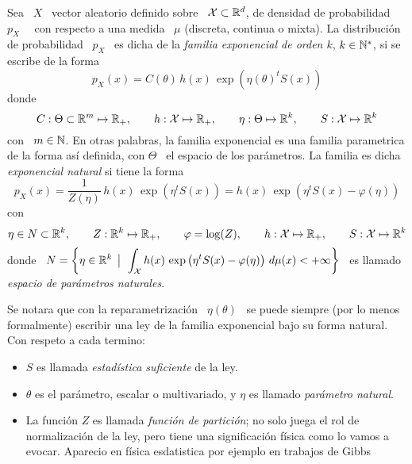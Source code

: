 \begin{definicion}\label{Def:MP:FamiliaExponencial}
%
  Sea  \ $X$  \  vector aleatorio  definido  sobre \  $\mathcal{X}  \subset \mathbb{R}^d$,  de
  densidad  de probabilidad  \  $p_X$ \  \ con  respecto  a una  medida \  $\mu$
  (discreta, continua o  mixta). La distribuci\'on de probabilidad  \ $p_X$ \ es
  dicha de  la {\em familia  exponencial de orden  $k$}, $k \in \mathbb{N}^*$,  si se
  escribe de la forma
  \[
  p_X(x) = C(\theta) \, h(x) \, \exp\left( \eta(\theta)^t S(x) \right)
  \]
  donde
  \[
  C:  \Theta \subset  \mathbb{R}^m \mapsto  \mathbb{R}_+,  \qquad h:  \mathcal{X} \mapsto  \mathbb{R}_+,
  \qquad \eta: \Theta \mapsto \mathbb{R}^k, \qquad S: \mathcal{X} \mapsto \mathbb{R}^k
  \]
  con \ $m \in \mathbb{N}$.  En otras palabras, la familia exponencial es una familia
  parametrica  de la  forma as\'i  definida, con  $\Theta$ \  el espacio  de los
  par\'ametros. La familia es dicha {\em exponencial natural} si tiene la forma
  \[
  p_X(x) = \frac{1}{Z(\eta)}  \, h(x) \, \exp\left( \eta^t  S(x) \right) = h(x)
  \, \exp\left( \eta^t S(x) - \varphi(\eta) \right)
  \]
  con
  \[
  \eta \in N \subset \mathbb{R}^k, \qquad Z: \mathbb{R}^k \mapsto \mathbb{R}_+, \qquad \varphi = \log(Z),
  \qquad h: \mathcal{X} \mapsto \mathbb{R}_+, \qquad S: \mathcal{X} \mapsto \mathbb{R}^k
  \]
  donde \  $\displaystyle N = \left\{ \eta \in  \mathbb{R}^k \:\: \big| \:\: \int_{\mathcal{X}} h(x)  \, \exp\left( \eta^t
      S(x) - \varphi(\eta) \right) \, d\mu(x)  < + \infty \right\}$ \ es llamado
  {\em espacio de par\'ametros naturales}.
\end{definicion}
%
Se notara  que con  la reparametrizaci\'on \  $\eta(\theta)$ \ se  puede siempre
(por lo  menos formalmente) escribir una  ley de la familia  exponencial bajo su
forma natural. Con respeto a cada termino:
%
\begin{itemize}
\item $S$ es llamada {\em estad\'istica suficiente} de la ley. 
%
\item $\theta$  es el par\'ametro, escalar  o multivariado, y  $\eta$ es llamado
  {\em par\'ametro natural}.
%
\item La funci\'on $Z$ es llamada  {\em funci\'on de partici\'on}; no solo juega
  el rol de  normalizaci\'on de la ley, pero  tiene una significaci\'on f\'isica
  como lo vamos a evocar. Aparecio en f\'isica esdatistica por ejemplo en trabajos de Gibbs~\cite{Gib01, Gib02}
\end{itemize}

